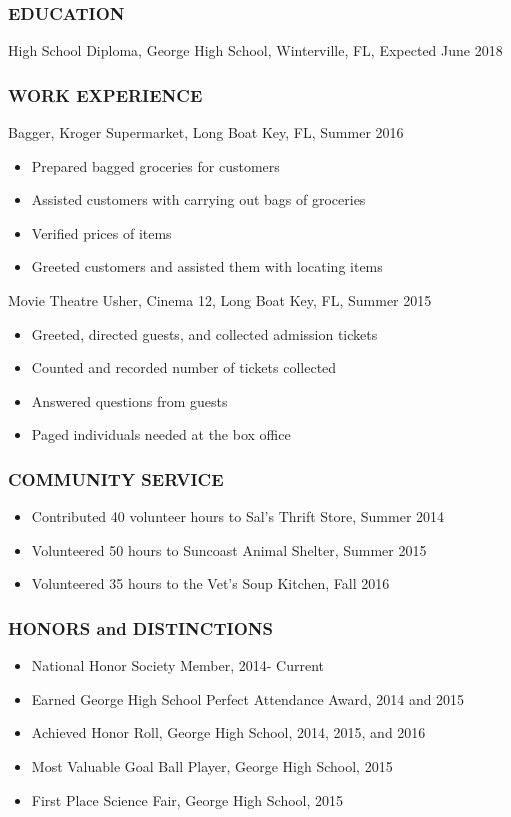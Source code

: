 \subsubsection*{EDUCATION}
\break High School Diploma, George High School, Winterville, FL, Expected June 2018

\subsubsection*{WORK EXPERIENCE}
\break Bagger, Kroger Supermarket, Long Boat Key, FL, Summer 2016
\begin{itemize}
	\item Prepared bagged groceries for customers
	\item Assisted customers with carrying out bags of groceries
	\item Verified prices of items
	\item Greeted customers and assisted them with locating items
\end{itemize}
Movie Theatre Usher, Cinema 12, Long Boat Key, FL, Summer 2015
\begin{itemize}
	\item Greeted, directed guests, and collected admission tickets
	\item Counted and recorded number of tickets collected
	\item Answered questions from guests
	\item Paged individuals needed at the box office
\end{itemize}

\subsubsection*{COMMUNITY SERVICE}
\begin{itemize}
	\item Contributed 40 volunteer hours to Sal's Thrift Store, Summer 2014
	\item Volunteered 50 hours to Suncoast Animal Shelter, Summer 2015
	\item Volunteered 35 hours to the Vet's Soup Kitchen, Fall 2016
\end{itemize}

\subsubsection*{HONORS and DISTINCTIONS}
\begin{itemize}
	\item National Honor Society Member, 2014- Current
	\item Earned George High School Perfect Attendance Award, 2014 and 2015
	\item Achieved Honor Roll, George High School, 2014, 2015, and 2016
	\item Most Valuable Goal Ball Player, George High School, 2015
	\item First Place Science Fair, George High School, 2015
\end{itemize}

